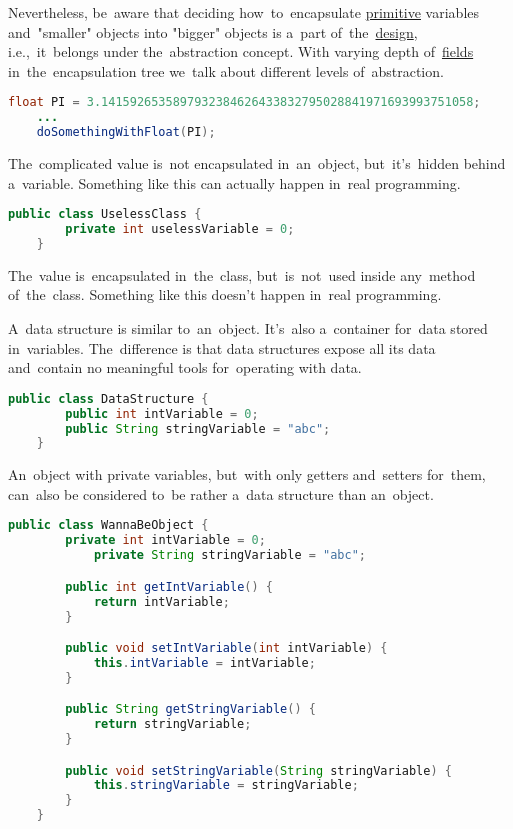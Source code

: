 Nevertheless, be~aware that deciding how~to~encapsulate \hyperref[javadatatypes]{primitive} variables and~"smaller" objects into "bigger" objects is a~part of~the~\hyperref[architecturedesign]{design}, i.e.,~it~belongs under the~abstraction concept.
With varying depth of~\hyperref[variablefieldproperty]{fields} in~the~encapsulation tree we~talk about different levels of~abstraction.

\begin{lstlisting}[language=Java]
    float PI = 3.1415926535897932384626433832795028841971693993751058;
    ...
    doSomethingWithFloat(PI);
\end{lstlisting}

\noindent The~complicated value is~not encapsulated in~an~object, but~it's~hidden behind a~variable.
Something like this can actually happen in~real programming.
\newpage

\begin{lstlisting}[language=Java]
    public class UselessClass {
        private int uselessVariable = 0;
    }
\end{lstlisting}

\noindent The~value is~encapsulated in~the~class, but~is~not~used inside any~method of~the~class.
Something like this doesn't happen in~real programming.

\label{objectdatastructure}
A~data structure is similar to~an~object.
It's~also a~container for~data stored in~variables.
The~difference is that data structures expose all its data and~contain no meaningful tools for~operating with data.

\begin{lstlisting}[language=Java]
    public class DataStructure {
        public int intVariable = 0;
        public String stringVariable = "abc";
    }
\end{lstlisting}

\noindent An~object with private variables, but~with only getters and~setters for~them, can~also be considered to~be rather a~data structure than an~object.

\begin{lstlisting}[language=Java]
    public class WannaBeObject {
        private int intVariable = 0;
            private String stringVariable = "abc";

        public int getIntVariable() {
            return intVariable;
        }

        public void setIntVariable(int intVariable) {
            this.intVariable = intVariable;
        }

        public String getStringVariable() {
            return stringVariable;
        }

        public void setStringVariable(String stringVariable) {
            this.stringVariable = stringVariable;
        }
    }
\end{lstlisting}


